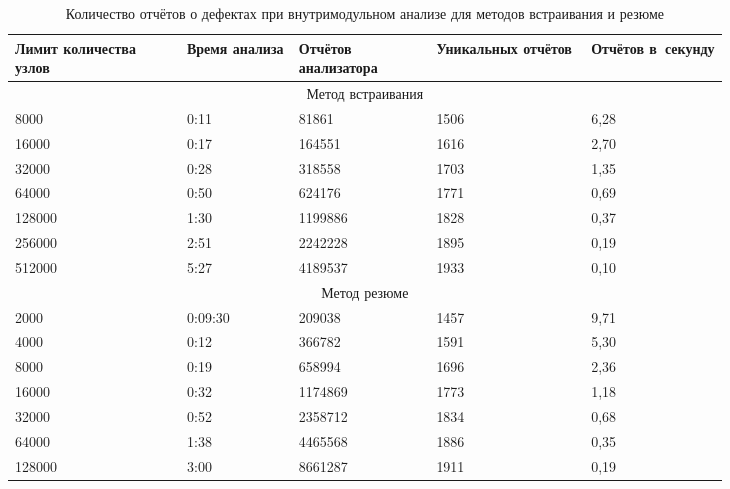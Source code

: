 \begin{table}
\renewcommand{\arraystretch}{1.2}
\begin{tabular}{| p{0.2\linewidth} | p{0.13\linewidth} | p{0.16\linewidth} | p{0.18\linewidth} |  p{0.16\linewidth} |} 
\hline
Лимит количества узлов & Время анализа & Отчётов анализатора & Уникальных отчётов & Отчётов в~секунду \\
\hline
\multicolumn{5}{|c|}{Метод встраивания} \\
\hline
\hline
8000      &   0:11       & 81861  & 1506 & 6,28 \\
\hline
16000     &   0:17       & 164551  & 1616 & 2,70 \\
\hline
32000     &   0:28       & 318558  & 1703 & 1,35 \\
\hline
64000     &   0:50       & 624176  & 1771 & 0,69 \\
\hline
128000    &   1:30       & 1199886  & 1828 & 0,37 \\
\hline
256000    &   2:51       & 2242228  & 1895 & 0,19 \\
\hline
512000    &   5:27       & 4189537  & 1933 & 0,10 \\
\hline
\hline
\multicolumn{5}{|c|}{Метод резюме} \\
\hline
\hline
2000      &   0:09:30    & 209038  & 1457 & 9,71 \\
\hline
4000      &   0:12       & 366782  & 1591 & 5,30 \\
\hline
8000      &   0:19       & 658994  & 1696 & 2,36 \\
\hline
16000     &   0:32       & 1174869  & 1773 & 1,18 \\
\hline
32000     &   0:52       & 2358712  & 1834 & 0,68 \\
\hline
64000     &   1:38       & 4465568  & 1886 & 0,35 \\
\hline
128000    &   3:00       & 8661287  & 1911 & 0,19 \\
\hline
\hline

\end{tabular}
\caption{Количество отчётов о дефектах при внутримодульном анализе для методов встраивания и резюме} \label{table:time-defect-single}
\end{table}

